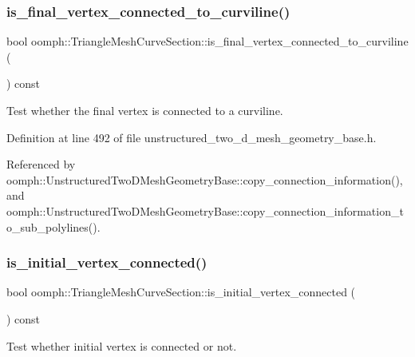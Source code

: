 \subsubsection{\texorpdfstring{is\+\_\+final\+\_\+vertex\+\_\+connected\+\_\+to\+\_\+curviline()}{is\_final\_vertex\_connected\_to\_curviline()}}
{\footnotesize\ttfamily bool oomph\+::\+Triangle\+Mesh\+Curve\+Section\+::is\+\_\+final\+\_\+vertex\+\_\+connected\+\_\+to\+\_\+curviline (\begin{DoxyParamCaption}{ }\end{DoxyParamCaption}) const\hspace{0.3cm}{\ttfamily [inline]}}



Test whether the final vertex is connected to a curviline. 



Definition at line 492 of file unstructured\+\_\+two\+\_\+d\+\_\+mesh\+\_\+geometry\+\_\+base.\+h.



Referenced by oomph\+::\+Unstructured\+Two\+D\+Mesh\+Geometry\+Base\+::copy\+\_\+connection\+\_\+information(), and oomph\+::\+Unstructured\+Two\+D\+Mesh\+Geometry\+Base\+::copy\+\_\+connection\+\_\+information\+\_\+to\+\_\+sub\+\_\+polylines().

\mbox{\label{classoomph_1_1TriangleMeshCurveSection_aaab51c1395c75a85bf761e09ddcd1b28}} 
\subsubsection{\texorpdfstring{is\+\_\+initial\+\_\+vertex\+\_\+connected()}{is\_initial\_vertex\_connected()}}
{\footnotesize\ttfamily bool oomph\+::\+Triangle\+Mesh\+Curve\+Section\+::is\+\_\+initial\+\_\+vertex\+\_\+connected (\begin{DoxyParamCaption}{ }\end{DoxyParamCaption}) const\hspace{0.3cm}{\ttfamily [inline]}}



Test whether initial vertex is connected or not. 



